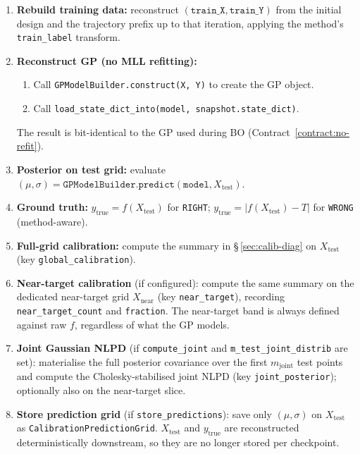 \documentclass[11pt]{article}
\newcommand{\RIGHT}{\texttt{RIGHT}}
\newcommand{\WRONG}{\texttt{WRONG}}
\begin{document}
\begin{enumerate}
  \item \textbf{Rebuild training data:} reconstruct
        $(\texttt{train\_X}, \texttt{train\_Y})$ from the initial design and the
        trajectory prefix up to that iteration, applying the method's
        \texttt{train\_label} transform.
  \item \textbf{Reconstruct GP (no MLL refitting):}
        \begin{enumerate}[label=(\alph*)]
          \item Call \texttt{GPModelBuilder.construct(X, Y)} to create the GP object.
          \item Call \texttt{load\_state\_dict\_into(model, snapshot.state\_dict)}.
        \end{enumerate}
        The result is bit-identical to the GP used during BO (Contract~\ref{contract:no-refit}).
  \item \textbf{Posterior on test grid:} evaluate $(\mu, \sigma) =
        \texttt{GPModelBuilder.predict}(\texttt{model}, X_{\mathrm{test}})$.
  \item \textbf{Ground truth:}
        $y_{\mathrm{true}} = f(X_{\mathrm{test}})$ for \RIGHT;
        $y_{\mathrm{true}} = |f(X_{\mathrm{test}}) - T|$ for \WRONG{} (method-aware).
  \item \textbf{Full-grid calibration:} compute the summary in \S\,\ref{sec:calib-diag}
        on $X_{\mathrm{test}}$ (key \texttt{global\_calibration}).
  \item \textbf{Near-target calibration} (if configured): compute the same summary
        on the dedicated near-target grid $X_{\mathrm{near}}$ (key
        \texttt{near\_target}), recording \texttt{near\_target\_count} and
        \texttt{fraction}. The near-target band is always defined against raw $f$,
        regardless of what the GP models.
  \item \textbf{Joint Gaussian NLPD} (if \texttt{compute\_joint} and
        \texttt{m\_test\_joint\_distrib} are set): materialise the full posterior
        covariance over the first $m_{\mathrm{joint}}$ test points and compute the
        Cholesky-stabilised joint NLPD (key \texttt{joint\_posterior}); optionally
        also on the near-target slice.
  \item \textbf{Store prediction grid} (if \texttt{store\_predictions}): save
        only $(\mu, \sigma)$ on $X_{\mathrm{test}}$ as
        \texttt{CalibrationPredictionGrid}. $X_{\mathrm{test}}$ and
        $y_{\mathrm{true}}$ are reconstructed deterministically downstream, so
        they are no longer stored per checkpoint.
\end{enumerate}
 
\end{document}
